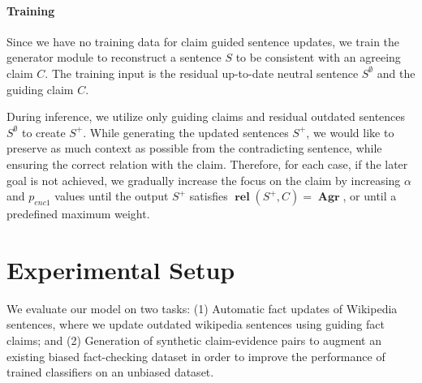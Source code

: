 \documentclass[letterpaper]{article} %
\DeclareMathOperator{\rel}{\boldsymbol{rel}}
\DeclareMathOperator{\A}{\boldsymbol{Agr}}
\begin{document}
\paragraph{Training}

Since we have no training data for claim guided sentence updates, we train the generator module to reconstruct a sentence $S$ to be consistent with an agreeing claim $C$. The training input is the residual up-to-date neutral sentence $S^{\emptyset}$ and the guiding claim $C$.

During inference, we utilize only guiding claims and residual outdated sentences $S^{\emptyset}$ to create $S^+$. While generating the updated sentences $S^+$, we would like to preserve as much context as possible from the contradicting sentence, while ensuring the correct relation with the claim. Therefore, for each case, if the later goal is not achieved, we gradually increase the focus on the claim by increasing $\alpha$ and $p_{enc1}$ values until the output $S^+$ satisfies $\rel(S^+,C)=\A$, or until a predefined maximum weight.



\section{Experimental Setup}
\label{sec:experiments}
We evaluate our model on two tasks: (1) Automatic fact updates of Wikipedia sentences, where we update outdated wikipedia sentences using guiding fact claims; and (2) Generation of synthetic claim-evidence pairs to augment an existing biased fact-checking dataset in order to improve the performance of trained classifiers on an unbiased dataset.
\end{document}
